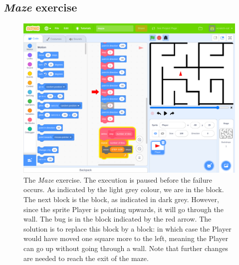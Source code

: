 \documentclass[../main]{subfiles}
\begin{document}
\subsection{\emph{Maze} exercise}\label{subsec:maze-exercise}

\begin{figure}
    \begin{wide}
        \includegraphics[width=\linewidth]{maze}
    \end{wide}
    \caption[The Maze exercise.]{
        The \emph{Maze} exercise.
        The execution is paused before the failure occurs.
        As indicated by the light grey colour, we are in the  block.
        The next block is the  block, as indicated in dark grey.
        However, since the sprite Player is pointing upwards, it will go through the wall.
        The bug is in the  block indicated by the red arrow.
        The solution is to replace this block by a  block: in which case the Player would have moved one square more to the left, meaning the Player can go up without going through a wall.
        Note that further changes are needed to reach the exit of the maze.
    }
    \label{fig:maze}
\end{figure}
\end{document}
